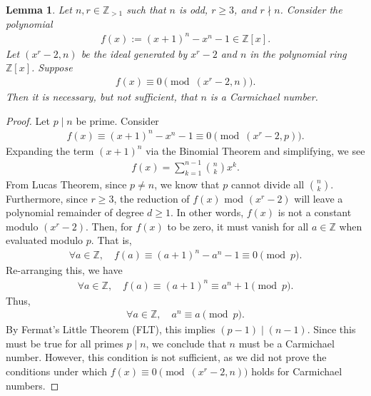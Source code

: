 \documentclass{article}
\theoremstyle{plain}
\newtheorem{lemma}[theorem]{Lemma}
\theoremstyle{definition}
\newcommand{\Z}{\mathbb{Z}}
\begin{document}
\begin{lemma} \label{proof:niscarmichaelnumber}
Let $n, r \in \Z_{>1}$ such that $n$ is odd, $r \geq 3$, and $r \nmid n$. Consider the polynomial
\begin{align*}
f(x) := (x+1)^n - x^n - 1 \in \Z[x] .
\end{align*}
Let $(x^r-2, n)$ be the ideal generated by $x^r-2$ and $n$ in the polynomial ring $\Z[x]$. Suppose
\begin{align*}
f(x) \equiv 0 \pmod{(x^r-2, n)} .
\end{align*}
Then it is necessary, but not sufficient, that $n$ is a Carmichael number.
\end{lemma}
\begin{proof}
Let $p \mid n$ be prime. Consider
\begin{align*}
    f(x) \equiv (x+1)^n - x^n - 1 \equiv 0 \pmod{(x^r-2, p)} .
\end{align*}
Expanding the term $(x+1)^n$ via the Binomial Theorem and simplifying, we see
\begin{align*}
    f(x) = \sum_{k=1}^{n-1} \binom{n}{k} x^k .
\end{align*}
From Lucas Theorem, since $p \not= n$, we know that $p$ cannot divide all $\binom{n}{k}$. Furthermore, since $r \geq 3$, the reduction of $f(x)$ mod $(x^r-2)$ will leave a polynomial remainder of degree $d \geq 1$. In other words, $f(x)$ is not a constant modulo $(x^r-2)$. Then, for $f(x)$ to be zero, it must vanish for all $a \in \Z$ when evaluated modulo $p$. That is, 
\begin{align*}
    \forall a \in \Z, \quad f(a) \equiv (a+1)^n - a^n - 1 \equiv 0 \pmod{p} .
\end{align*}
Re-arranging this, we have
\begin{align*}
    \forall a \in \Z, \quad f(a) \equiv (a+1)^n \equiv a^n + 1 \pmod{p} .
\end{align*}
Thus,
\begin{align*}
    \forall a \in \Z, \quad a^n \equiv a \pmod{p} .
\end{align*}
By Fermat's Little Theorem (FLT), this implies $(p-1) \mid (n-1)$. Since this must be true for all primes $p \mid n$, we conclude that $n$ must be a Carmichael number. However, this condition is not sufficient, as we did not prove the conditions under which $f(x) \equiv 0 \pmod{(x^r-2, n)}$ holds for Carmichael numbers.
\end{proof}
\end{document}
